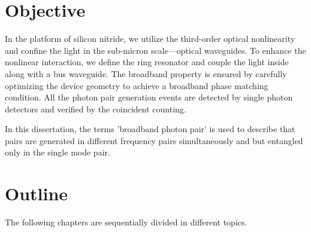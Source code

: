 \section{Objective}
In the platform of silicon nitride, we utilize the third-order optical nonlinearity and confine the light in the sub-micron scale---optical waveguides. To enhance the nonlinear interaction, we define the ring resonator and couple the light inside along with a bus waveguide. The broadband property is ensured by carefully optimizing the device geometry to achieve a broadband phase matching condition. All the photon pair generation events are detected by single photon detectors and verified by the coincident counting.

In this dissertation, the terms 'broadband photon pair' is used to describe that pairs are generated in different frequency pairs simultaneously and but entangled only in the single mode pair. 

\section{Outline}
The following chapters are sequentially divided in different topics.
